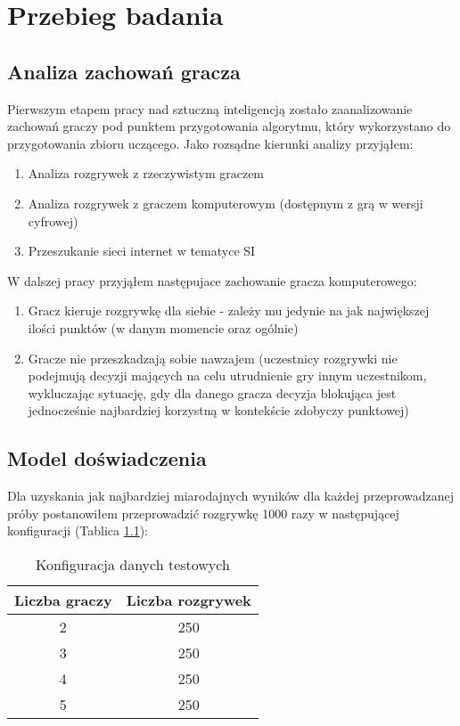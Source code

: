 \documentclass[12pt, oneside]{report}
\begin{document}
\chapter{Przebieg badania}
\section{Analiza zachowań gracza}
Pierwszym etapem pracy nad sztuczną inteligencją zostało zaanalizowanie zachowań graczy pod punktem przygotowania algorytmu, który wykorzystano do przygotowania zbioru uczącego. Jako rozsądne kierunki analizy przyjąłem:
	\begin{enumerate}
		\item{Analiza rozgrywek z rzeczywistym graczem}
		\item{Analiza rozgrywek z graczem komputerowym (dostępnym z grą w wersji cyfrowej)}
		\item{Przeszukanie sieci internet w tematyce SI}
	\end{enumerate}
W dalszej pracy przyjąłem następujace zachowanie gracza komputerowego:
\begin{enumerate}
	\item Gracz kieruje rozgrywkę dla siebie - zależy mu jedynie na jak największej ilości punktów (w danym momencie oraz ogólnie)
	\item Gracze nie przeszkadzają sobie nawzajem (uczestnicy rozgrywki nie podejmują decyzji mających na celu utrudnienie gry innym uczestnikom, wykluczając sytuację, gdy dla danego gracza decyzja blokująca jest jednocześnie najbardziej korzystną w kontekście zdobyczy punktowej)
\end{enumerate}
\section{Model doświadczenia}
Dla uzyskania jak najbardziej miarodajnych wyników dla każdej przeprowadzanej próby postanowiłem przeprowadzić rozgrywkę 1000 razy w następującej konfiguracji (Tablica \ref{table:gameconfig}):
\begin{table}[h]
	\begin{center}
		\begin{tabular}{| c | c |} \hline
			Liczba graczy & Liczba rozgrywek \\ \hline
			2 & 250 \\ \hline
			3 & 250 \\ \hline
			4 & 250 \\ \hline
			5 & 250 \\ \hline
		\end{tabular}
		\caption{Konfiguracja danych testowych}
		\label{table:gameconfig}
	\end{center}
\end{table}
\end{document}
